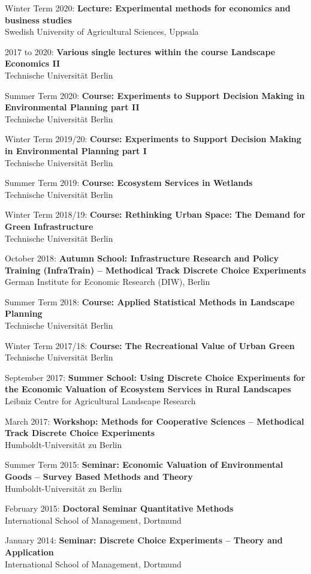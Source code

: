 \documentclass[paper=a4,fontsize=11pt]{scrartcl} %
\newcommand{\CourseEntry}[3]{
		\noindent \item{#1: \textbf{#2} \\ #3}}
\begin{document}
\begin{etaremune}
\item[]
\vspace{-24pt}

\CourseEntry{Winter Term 2020}{Lecture: Experimental methods for economics and business studies}{Swedish University of Agricultural Sciences, Uppsala}

\CourseEntry{2017 to 2020}{Various single lectures within the course Landscape Economics II}{Technische Universität Berlin}

\CourseEntry{Summer Term 2020}{Course: Experiments to Support Decision Making in Environmental Planning part II}{Technische Universität Berlin}

\CourseEntry{Winter Term 2019/20}{Course: Experiments to Support Decision Making in Environmental Planning part I}{Technische Universität Berlin}

\CourseEntry{Summer Term 2019}{Course: Ecosystem Services in Wetlands}{Technische Universität Berlin}

\CourseEntry{Winter Term 2018/19}{Course: Rethinking Urban Space: The Demand for Green Infrastructure}{Technische Universität Berlin}

\CourseEntry{October 2018}{Autumn School: Infrastructure Research and Policy Training (InfraTrain) -- Methodical Track Discrete Choice Experiments}{German Institute for Economic Research (DIW), Berlin}

\CourseEntry{Summer Term 2018}{Course: Applied Statistical Methods in Landscape Planning}{Technische Universität Berlin}

\CourseEntry{Winter Term 2017/18}{Course: The Recreational Value of Urban Green}{Technische Universität Berlin}

\CourseEntry{September 2017}{Summer School: Using Discrete Choice Experiments for the Economic Valuation of Ecosystem Services in Rural Landscapes}{Leibniz Centre for Agricultural Landscape Research}

\CourseEntry{March 2017}{Workshop: Methods for Cooperative Sciences -- Methodical Track Discrete Choice Experiments}{Humboldt-Universität zu Berlin}


\CourseEntry{Summer Term 2015}{Seminar: Economic Valuation of Environmental Goods – Survey Based Methods and Theory}{Humboldt-Universität zu Berlin}

\CourseEntry{February 2015}{Doctoral Seminar Quantitative Methods}{International School of Management, Dortmund}

\CourseEntry{January 2014}{Seminar: Discrete Choice Experiments – Theory and Application}{International School of Management, Dortmund}
\end{etaremune}
\end{document}

